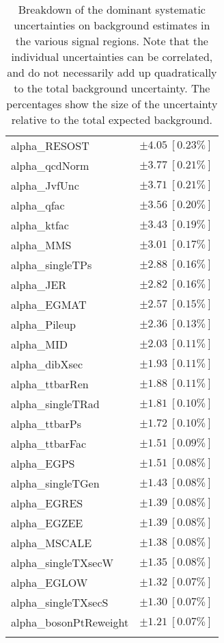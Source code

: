 \begin{table}
\begin{center}
\begin{tabular*}{\textwidth}{@{\extracolsep{\fill}}lc}
alpha\_RESOST         & $\pm 4.05\ [0.23\%] $       \\
alpha\_qcdNorm         & $\pm 3.77\ [0.21\%] $       \\
alpha\_JvfUnc         & $\pm 3.71\ [0.21\%] $       \\
alpha\_qfac         & $\pm 3.56\ [0.20\%] $       \\
alpha\_ktfac         & $\pm 3.43\ [0.19\%] $       \\
alpha\_MMS         & $\pm 3.01\ [0.17\%] $       \\
alpha\_singleTPs         & $\pm 2.88\ [0.16\%] $       \\
alpha\_JER         & $\pm 2.82\ [0.16\%] $       \\
alpha\_EGMAT         & $\pm 2.57\ [0.15\%] $       \\
alpha\_Pileup         & $\pm 2.36\ [0.13\%] $       \\
alpha\_MID         & $\pm 2.03\ [0.11\%] $       \\
alpha\_dibXsec         & $\pm 1.93\ [0.11\%] $       \\
alpha\_ttbarRen         & $\pm 1.88\ [0.11\%] $       \\
alpha\_singleTRad         & $\pm 1.81\ [0.10\%] $       \\
alpha\_ttbarPs         & $\pm 1.72\ [0.10\%] $       \\
alpha\_ttbarFac         & $\pm 1.51\ [0.09\%] $       \\
alpha\_EGPS         & $\pm 1.51\ [0.08\%] $       \\
alpha\_singleTGen         & $\pm 1.43\ [0.08\%] $       \\
alpha\_EGRES         & $\pm 1.39\ [0.08\%] $       \\
alpha\_EGZEE         & $\pm 1.39\ [0.08\%] $       \\
alpha\_MSCALE         & $\pm 1.38\ [0.08\%] $       \\
alpha\_singleTXsecW         & $\pm 1.35\ [0.08\%] $       \\
alpha\_EGLOW         & $\pm 1.32\ [0.07\%] $       \\
alpha\_singleTXsecS         & $\pm 1.30\ [0.07\%] $       \\
alpha\_bosonPtReweight         & $\pm 1.21\ [0.07\%] $       \\
\noalign{\smallskip}\hline\noalign{\smallskip}
\end{tabular*}
\end{center}
\caption[Breakdown of uncertainty on background estimates]{
Breakdown of the dominant systematic uncertainties on background estimates in the various signal regions.
Note that the individual uncertainties can be correlated, and do not necessarily add up quadratically to 
the total background uncertainty. The percentages show the size of the uncertainty relative to the total expected background.
\label{table.results.bkgestimate.uncertainties.SR}}
\end{table}
%
